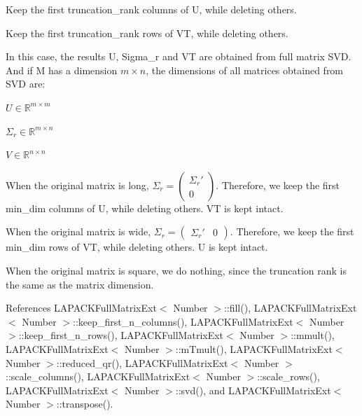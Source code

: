 Keep the first {\ttfamily truncation\+\_\+rank} columns of {\ttfamily U}, while deleting others.

Keep the first {\ttfamily truncation\+\_\+rank} rows of {\ttfamily VT}, while deleting others.

In this case, the results {\ttfamily U}, {\ttfamily Sigma\+\_\+r} and {\ttfamily VT} are obtained from full matrix S\+VD. And if {\ttfamily M} has a dimension $m \times n$, the dimensions of all matrices obtained from S\+VD are\+:
\begin{DoxyItemize}
\item $U \in \mathbb{R}^{m \times m}$
\item $\Sigma_r \in \mathbb{R}^{m \times n}$
\item $V \in \mathbb{R}^{n \times n}$
\end{DoxyItemize}

When the original matrix is long, $\Sigma_r = \begin{pmatrix}\Sigma_r' \\ 0 \end{pmatrix}$. Therefore, we keep the first {\ttfamily min\+\_\+dim} columns of {\ttfamily U}, while deleting others. {\ttfamily VT} is kept intact.

When the original matrix is wide, $\Sigma_r = \begin{pmatrix} \Sigma_r' & 0 \end{pmatrix}$. Therefore, we keep the first {\ttfamily min\+\_\+dim} rows of {\ttfamily VT}, while deleting others. {\ttfamily U} is kept intact.

When the original matrix is square, we do nothing, since the truncation rank is the same as the matrix dimension.

References L\+A\+P\+A\+C\+K\+Full\+Matrix\+Ext$<$ Number $>$\+::fill(), L\+A\+P\+A\+C\+K\+Full\+Matrix\+Ext$<$ Number $>$\+::keep\+\_\+first\+\_\+n\+\_\+columns(), L\+A\+P\+A\+C\+K\+Full\+Matrix\+Ext$<$ Number $>$\+::keep\+\_\+first\+\_\+n\+\_\+rows(), L\+A\+P\+A\+C\+K\+Full\+Matrix\+Ext$<$ Number $>$\+::mmult(), L\+A\+P\+A\+C\+K\+Full\+Matrix\+Ext$<$ Number $>$\+::m\+Tmult(), L\+A\+P\+A\+C\+K\+Full\+Matrix\+Ext$<$ Number $>$\+::reduced\+\_\+qr(), L\+A\+P\+A\+C\+K\+Full\+Matrix\+Ext$<$ Number $>$\+::scale\+\_\+columns(), L\+A\+P\+A\+C\+K\+Full\+Matrix\+Ext$<$ Number $>$\+::scale\+\_\+rows(), L\+A\+P\+A\+C\+K\+Full\+Matrix\+Ext$<$ Number $>$\+::svd(), and L\+A\+P\+A\+C\+K\+Full\+Matrix\+Ext$<$ Number $>$\+::transpose().

\mbox{\label{classLAPACKFullMatrixExt_a4b4bb2b69261608f54c42f329d272195}} 
